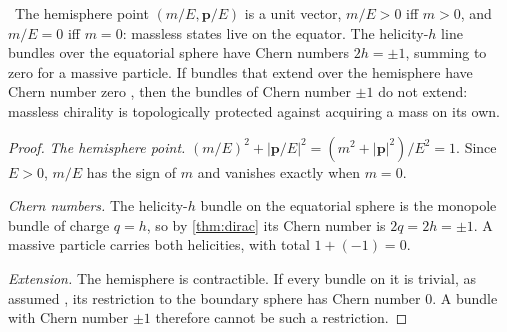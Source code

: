 \begin{proposition}\label{prop:helicity}\ver\
The hemisphere point $(m/E,\mathbf p/E)$ is a unit vector, $m/E>0$ iff $m>0$, and $m/E=0$ iff $m=0$: massless states live on the equator. The helicity-$h$ line bundles over the equatorial sphere have Chern numbers $2h=\pm1$, summing to zero for a massive particle. If bundles that extend over the hemisphere have Chern number zero \ext, then the bundles of Chern number $\pm1$ do not extend: massless chirality is topologically protected against acquiring a mass on its own.
\end{proposition}
\begin{proof}
\emph{The hemisphere point.} $(m/E)^2+|\mathbf p/E|^2=(m^2+|\mathbf p|^2)/E^2=1$. Since $E>0$, $m/E$ has the sign of $m$ and vanishes exactly when $m=0$.

\emph{Chern numbers.} The helicity-$h$ bundle on the equatorial sphere is the monopole bundle of charge $q=h$, so by \cref{thm:dirac} its Chern number is $2q=2h=\pm1$. A massive particle carries both helicities, with total $1+(-1)=0$.

\emph{Extension.} The hemisphere is contractible. If every bundle on it is trivial, as assumed \ext, its restriction to the boundary sphere has Chern number $0$. A bundle with Chern number $\pm1$ therefore cannot be such a restriction.
\end{proof}



